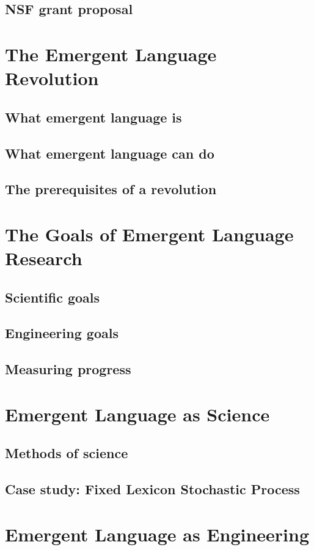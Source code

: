 \documentclass[letterpaper]{report}
\begin{document}
\section{NSF grant proposal}

\chapter{The Emergent Language Revolution}
\section{What emergent language is}
\section{What emergent language can do}
\section{The prerequisites of a revolution}

\chapter{The Goals of Emergent Language Research}
\section{Scientific goals}
\section{Engineering goals}
\section{Measuring progress}

\chapter{Emergent Language as Science}
\section{Methods of science}
\section{Case study: Fixed Lexicon Stochastic Process}

\chapter{Emergent Language as Engineering}
\end{document}
